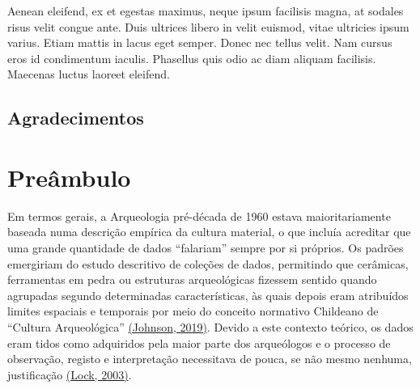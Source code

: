 \documentclass[
  letterpaper,
  DIV=11,
  numbers=noendperiod]{scrreprt}
\begin{document}
Aenean eleifend, ex et egestas maximus, neque ipsum facilisis magna, at
sodales risus velit congue ante. Duis ultrices libero in velit euismod,
vitae ultricies ipsum varius. Etiam mattis in lacus eget semper. Donec
nec tellus velit. Nam cursus eros id condimentum iaculis. Phasellus quis
odio ac diam aliquam facilisis. Maecenas luctus laoreet eleifend.

\section*{Agradecimentos}\label{agradecimentos}



\chapter*{Preâmbulo}\label{preuxe2mbulo}


Em termos gerais, a Arqueologia pré-década de 1960 estava
maioritariamente baseada numa descrição empírica da cultura material, o
que incluía acreditar que uma grande quantidade de dados ``falariam''
sempre por si próprios. Os padrões emergiriam do estudo descritivo de
coleções de dados, permitindo que cerâmicas, ferramentas em pedra ou
estruturas arqueológicas fizessem sentido quando agrupadas segundo
determinadas características, às quais depois eram atribuídos limites
espaciais e temporais por meio do conceito normativo Childeano de
``Cultura Arqueológica''
\href{https://www.zotero.org/google-docs/?gebJdf}{(Johnson, 2019)}.
Devido a este contexto teórico, os dados eram tidos como adquiridos pela
maior parte dos arqueólogos e o processo de observação, registo e
interpretação necessitava de pouca, se não mesmo nenhuma, justificação
\href{https://www.zotero.org/google-docs/?eiFPcA}{(Lock, 2003)}.
\end{document}
